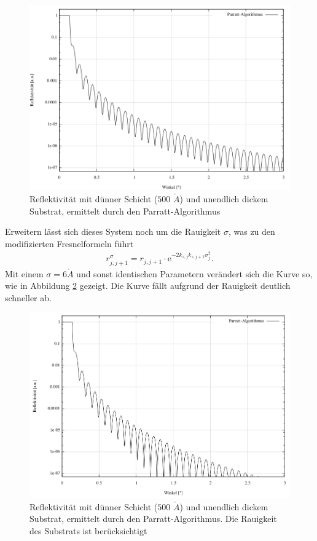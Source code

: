 \begin{figure}[H]
 \includegraphics[width=\textwidth]{../pics/normal.jpg}
 \caption{Reflektivität mit dünner Schicht ($500$ $\mathring{A}$) und unendlich dickem Substrat, ermittelt durch den Parratt-Algorithmus}
 \label{pic_ReflNormal}
\end{figure}
\noindent
Erweitern lässt sich dieses System noch um die Rauigkeit $\sigma$, was zu den modifizierten Fresnelformeln führt
\begin{align}
 r^\sigma_{j,j+1} = r_{j,j+1} \cdot \text{e}^{-2k_{z,j}k_{z,j+1}\sigma_j^2}.
\end{align}
Mit einem $\sigma = 6\mathring{A}$ und sonst identischen Parametern verändert sich die Kurve so, wie in Abbildung \ref{pic_ReflRau} gezeigt. Die Kurve fällt aufgrund
der Rauigkeit deutlich schneller ab.

\begin{figure}[H]
 \includegraphics[width=\textwidth]{../pics/rau.jpg}
 \caption{Reflektivität mit dünner Schicht ($500$ $\mathring{A}$) und unendlich dickem Substrat, ermittelt durch den Parratt-Algorithmus. Die Rauigkeit des Substrats ist berücksichtigt}
 \label{pic_ReflRau}
\end{figure}


